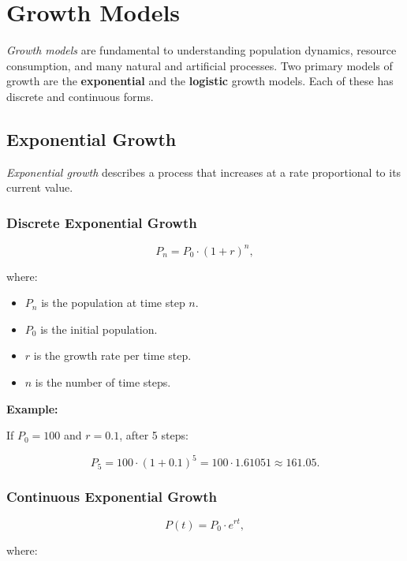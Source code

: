 \chapter{Growth Models}

\emph{Growth models} are fundamental to understanding population dynamics, resource consumption, and many natural and artificial processes. Two 
primary models of growth are the \textbf{exponential} and the \textbf{logistic} growth models. Each of these has discrete and continuous forms.

\section{Exponential Growth}

\emph{Exponential growth} describes a process that increases at a rate proportional to its current value.

\subsection{Discrete Exponential Growth}

\[
  P_{n} = P_0 \cdot (1 + r)^n,
\]

where:

\begin{itemize}

  \item \(P_n\) is the population at time step \(n\).

  \item \(P_0\) is the initial population.

  \item \(r\) is the growth rate per time step.

  \item \(n\) is the number of time steps.

\end{itemize}

\textbf{Example:}

If \(P_0 = 100\) and \(r = 0.1\), after 5 steps:

\[
    P_5 = 100 \cdot {(1 + 0.1)}^5 = 100 \cdot 1.61051 \approx 161.05.
\]

\subsection{Continuous Exponential Growth}

\[
    P(t) = P_0 \cdot e^{rt},
\]

where:

